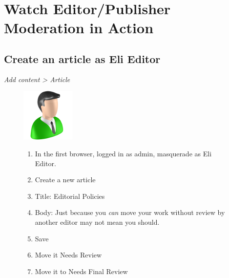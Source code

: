 \documentclass[letterpaper,10pt,english]{sphinxmanual}
\begin{document}
\chapter{Watch Editor/Publisher Moderation in Action}
\label{moderation:watch-editor-publisher-moderation-in-action}

\section{Create an article as Eli Editor}
\label{moderation:create-an-article-as-eli-editor}
\emph{Add content \textgreater{} Article}
\begin{figure}[htbp]
\centering

\includegraphics{sites/default/files/recipes/user_icons/editor.png}
{\small \begin{enumerate}
\item {} 
In the first browser, logged in as admin, masquerade as Eli Editor.

\item {} 
Create a new article

\item {} 
Title: Editorial Policies

\item {} 
Body:  Just because you \emph{can} move your work without review by another editor may not mean you should.

\item {} 
Save

\item {} 
Move it Needs Review

\item {} 
Move it to Needs Final Review

\end{enumerate}
}\end{figure}
\end{document}
